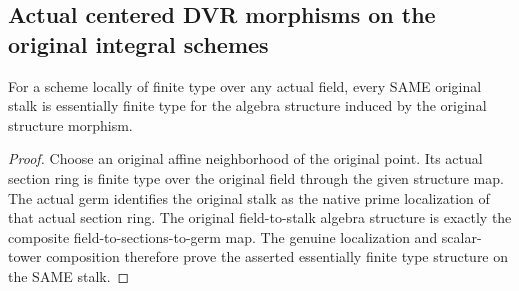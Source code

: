 \subsection{Actual centered DVR morphisms on the original integral schemes}

\begin{lemma}
\label{alggeom:original-stalk-essentially-finite-type}
\leanok
For a scheme locally of finite type over any actual field, every SAME original
stalk is essentially finite type for the algebra structure induced by the
original structure morphism.
\end{lemma}
\begin{proof}
Choose an original affine neighborhood of the original point. Its actual
section ring is finite type over the original field through the given
structure map. The actual germ identifies the original stalk as the native
prime localization of that actual section ring. The original field-to-stalk
algebra structure is exactly the composite field-to-sections-to-germ map.
The genuine localization and scalar-tower composition therefore prove the
asserted essentially finite type structure on the SAME stalk.
\end{proof}

